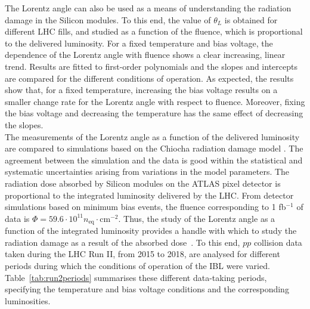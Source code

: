  
The Lorentz angle can also be used as a means of understanding the radiation damage in the Silicon modules. To this end, the value of $\theta_L$ is obtained for different LHC fills, and studied as a function of the fluence, which is proportional to the delivered luminosity. For a fixed temperature and bias voltage, the dependence of the Lorentz angle with fluence shows a clear increasing, linear trend. Results are fitted to first-order polynomials and the slopes and intercepts are compared for the different conditions of operation. As expected, the results show that, for a fixed temperature, increasing the bias voltage results on a smaller change rate for the Lorentz angle with respect to fluence. Moreover, fixing the bias voltage and decreasing the temperature has the same effect of decreasing the slopes.\\
\newline
The measurements of the Lorentz angle as a function of the delivered luminosity are compared to simulations based on the Chiocha radiation damage model \cite{bib:chiochia}. The agreement between the simulation and the data is good within the statistical and systematic uncertainties arising from variations in the model parameters.
%
The radiation dose absorbed by Silicon modules on the ATLAS pixel detector is proportional to the integrated luminosity delivered by the LHC. From detector simulations based on minimum bias events, the fluence corresponding to 1 fb$^{-1}$ of data is $\Phi = 59.6\cdot 10^{11} n_{\mathrm{eq}}\cdot$cm$^{-2}$. Thus, the study of the Lorentz angle as a function of the integrated luminosity provides a handle with which to study the radiation damage as a result of the absorbed dose~\cite{bib:llorente1,bib:llorente2}. To this end, $pp$ collision data taken during the LHC Run II, from 2015 to 2018, are analysed for different periods during which the conditions of operation of the IBL were varied. Table~\ref{tab:run2periods} summarises these different data-taking periods, specifying the temperature and bias voltage conditions and the corresponding luminosities.
